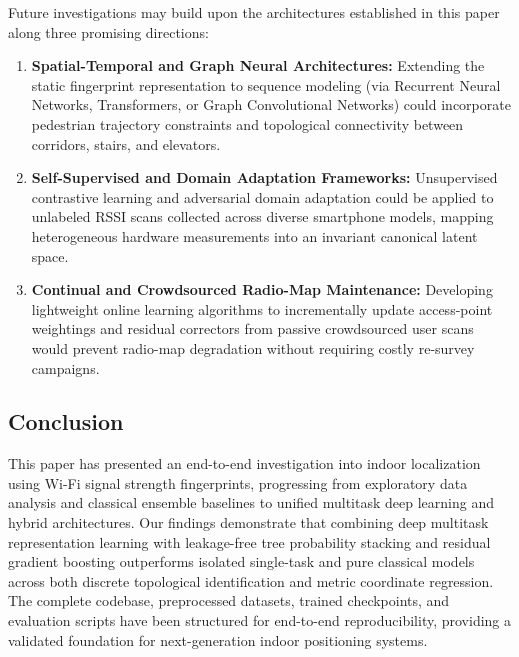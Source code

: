 Future investigations may build upon the architectures established in this paper along three promising directions:

\begin{enumerate}
    \item \textbf{Spatial-Temporal and Graph Neural Architectures:} 
    Extending the static fingerprint representation to sequence modeling (via Recurrent Neural Networks, Transformers, or Graph Convolutional Networks) could incorporate pedestrian trajectory constraints and topological connectivity between corridors, stairs, and elevators.
    
    \item \textbf{Self-Supervised and Domain Adaptation Frameworks:} 
    Unsupervised contrastive learning and adversarial domain adaptation could be applied to unlabeled RSSI scans collected across diverse smartphone models, mapping heterogeneous hardware measurements into an invariant canonical latent space.
    
    \item \textbf{Continual and Crowdsourced Radio-Map Maintenance:} 
    Developing lightweight online learning algorithms to incrementally update access-point weightings and residual correctors from passive crowdsourced user scans would prevent radio-map degradation without requiring costly re-survey campaigns.
\end{enumerate}

\subsection{Conclusion}

This paper has presented an end-to-end investigation into indoor localization using Wi-Fi signal strength fingerprints, progressing from exploratory data analysis and classical ensemble baselines to unified multitask deep learning and hybrid architectures. Our findings demonstrate that combining deep multitask representation learning with leakage-free tree probability stacking and residual gradient boosting outperforms isolated single-task and pure classical models across both discrete topological identification and metric coordinate regression. The complete codebase, preprocessed datasets, trained checkpoints, and evaluation scripts have been structured for end-to-end reproducibility, providing a validated foundation for next-generation indoor positioning systems.
